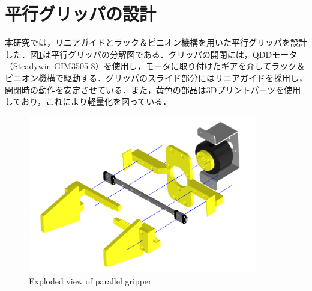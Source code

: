 \section{平行グリッパの設計}
本研究では，リニアガイドとラック＆ピニオン機構を用いた平行グリッパを設計した．図\ref{fig:hand}は平行グリッパの分解図である．グリッパの開閉には，QDDモータ（Steadywin GIM3505-8）を使用し，モータに取り付けたギアを介してラック＆ピニオン機構で駆動する．グリッパのスライド部分にはリニアガイドを採用し，開閉時の動作を安定させている．また，黄色の部品は3Dプリントパーツを使用しており，これにより軽量化を図っている．
\begin{figure}[htbp]
  \centering
  \includegraphics[width=10cm]{images/design/hand.png}
  \caption{Exploded view of parallel gripper}
  \label{fig:hand}
\end{figure}

\newpage